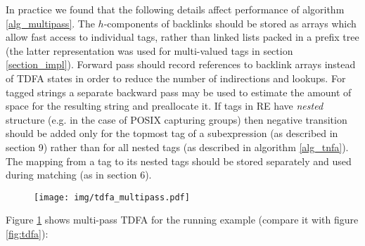 \documentclass[]{article}
\begin{document}
In practice we found that the following details affect performance of algorithm \ref{alg_multipass}.
The $h$-components of backlinks should be stored as arrays which allow fast access to individual tags,
rather than linked lists packed in a prefix tree (the latter representation was used for multi-valued tags in section \ref{section_impl}).
Forward pass should record references to backlink arrays instead of TDFA states in order to reduce the number of indirections and lookups.
For tagged strings a separate backward pass may be used to estimate the amount of space for the resulting string and preallocate it.
If tags in RE have \emph{nested} structure (e.g. in the case of POSIX capturing groups)
then negative transition should be added only for the topmost tag of a subexpression (as described in \cite{BorTro19} section 9)
rather than for all nested tags (as described in algorithm \ref{alg_tnfa}).
The mapping from a tag to its nested tags should be stored separately and used during matching (as in \cite{BorTro19} section 6).
\medskip

\begin{figure}[b]
\texttt{[image: img/tdfa\_multipass.pdf]}
\vspace{0.5em}
\label{fig:tdfa_multipass}
\end{figure}
\medskip

Figure \ref{fig:tdfa_multipass} shows multi-pass TDFA for the running example (compare it with figure \ref{fig:tdfa}):
\medskip
\end{document}
